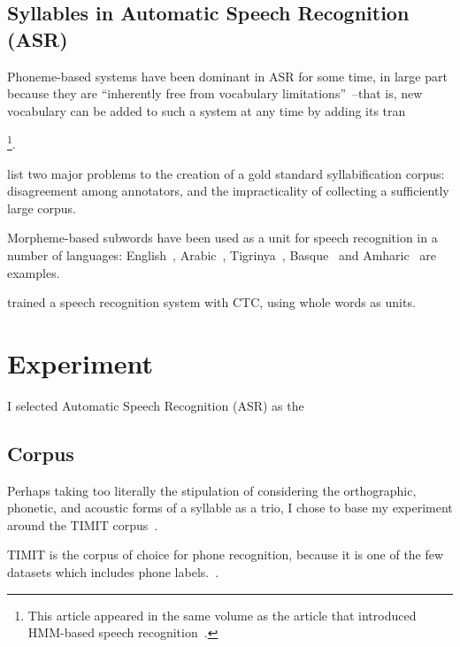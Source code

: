 \documentclass{article}[11pt]
\begin{document}


\citet{baayen_r_h_celex2_1995}

\subsection{Syllables in Automatic Speech Recognition (ASR)}
\label{ssect:syllasr}

Phoneme-based systems have been dominant in ASR for some time, in large part because they are ``inherently free from vocabulary limitations''~\citep{lopes_phoneme_2011}--that is, new vocabulary can be added to such a system at any time by adding its tran

\citep{fujimura_syllable_1975}\footnote{This article appeared in the same volume as the article that introduced HMM-based speech recognition~\citep{baker_dragon_1975}.}.

\citet{marchand_automatic_2009} list two major problems to the creation of a gold standard syllabification corpus: disagreement among annotators, and the impracticality of collecting a sufficiently large corpus.

Morpheme-based subwords have been used as a unit for speech recognition in a number of languages: English~\citep{huckvale_using_2002}, Arabic~\citep{jafri_concatenative_2021}, Tigrinya~\citep{abera_tigrinya_2020}, Basque~\citep{guijarrubia_morpheme-based_2009} and Amharic~\citep{tachbelie_morpheme-based_2010} are examples.

\citet{soltau_neural_2017} trained a speech recognition system with CTC, using whole words as units.

\section{Experiment}
\label{sect:experiment}

I selected Automatic Speech Recognition (ASR) as the 

\subsection{Corpus}

Perhaps taking too literally the stipulation of considering the orthographic, phonetic, and acoustic forms of a syllable as a trio, I chose to base my experiment around the TIMIT corpus~\citep{garofolo_john_s_timit_nodate}.

TIMIT is the corpus of choice for phone recognition, because it is one of the few datasets which includes phone labels.~\citep{lopes_phoneme_2011}. 





%
\end{document}
